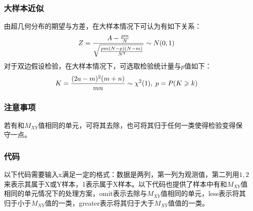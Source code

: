 \subsubsection{大样本近似}
由超几何分布的期望与方差，在大样本情况下可认为有如下关系：
\begin{equation}
	Z=\frac{A - \frac{pm}{N}}{\sqrt{\frac{pm(N-p)(N-m)}{N^3}}} \sim N(0,1)\notag
\end{equation}
\hspace{2em}对于双边假设检验，在大样本情况下，可选取检验统计量与$p$值如下：
\begin{equation}
	K=\frac{(2a-m)^2(m+n)}{mn}\sim\chi^2(1),\;
	p=P(K\geqslant k)\notag
\end{equation}
\subsubsection{注意事项}
若有和$M_{XY}$值相同的单元，可将其去除，也可将其归于任何一类使得检验变得保守一点。
\subsubsection{代码}
以下代码需要输入x满足一定的格式：数据是两列，第一列为观测值，第二列用$1,2$来表示其属于X或Y样本，1表示属于X样本。以下代码也提供了样本中有和$M_{XY}$值相同的单元情况下的处理方案，omit表示去除与$M_{XY}$值相同的单元，less表示将其归于小于$M_{XY}$值的一类，greater表示将其归于大于$M_{XY}$值值的一类。
\inputminted[bgcolor=white, linenos, frame=single, numbersep=5pt, breaklines]{r}{nonparametric-statistics/chapter2/brown-mood.R}